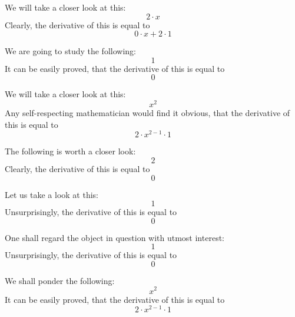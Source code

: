 \documentclass{article}
\begin{document}
We will take a closer look at this:
\begin{equation}
2 \cdot x 
\end{equation}
Clearly, the derivative of this is equal to
\begin{equation}
0 \cdot x + 2 \cdot 1 
\end{equation}

We are going to study the following:
\begin{equation}
1 
\end{equation}
It can be easily proved, that the derivative of this is equal to
\begin{equation}
0 
\end{equation}

We will take a closer look at this:
\begin{equation}
x ^{2 } 
\end{equation}
Any self-respecting mathematician would find it obvious, that the derivative of this is equal to
\begin{equation}
2 \cdot x ^{2 - 1 } \cdot 1 
\end{equation}

The following is worth a closer look:
\begin{equation}
2 
\end{equation}
Clearly, the derivative of this is equal to
\begin{equation}
0 
\end{equation}

Let us take a look at this:
\begin{equation}
1 
\end{equation}
Unsurprisingly, the derivative of this is equal to
\begin{equation}
0 
\end{equation}

One shall regard the object in question with utmost interest:
\begin{equation}
1 
\end{equation}
Unsurprisingly, the derivative of this is equal to
\begin{equation}
0 
\end{equation}

We shall ponder the following:
\begin{equation}
x ^{2 } 
\end{equation}
It can be easily proved, that the derivative of this is equal to
\begin{equation}
2 \cdot x ^{2 - 1 } \cdot 1 
\end{equation}
\end{document}
